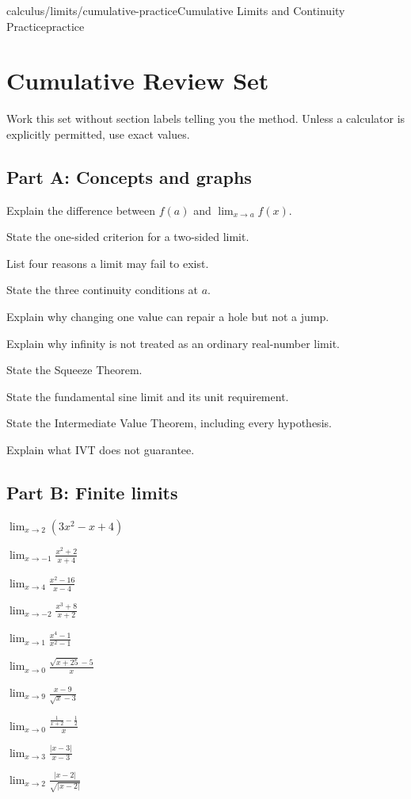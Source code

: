 \begin{webpage}{calculus/limits/cumulative-practice}{Cumulative Limits and Continuity Practice}{practice}
\section{Cumulative Review Set}

Work this set without section labels telling you the method. Unless a calculator is explicitly permitted, use exact values.

\subsection*{Part A: Concepts and graphs}
\begin{bgexercises}[label=\textbf{R\arabic*.}]
  \item Explain the difference between \(f(a)\) and \(\lim_{x\to a}f(x)\).
  \item State the one-sided criterion for a two-sided limit.
  \item List four reasons a limit may fail to exist.
  \item State the three continuity conditions at \(a\).
  \item Explain why changing one value can repair a hole but not a jump.
  \item Explain why infinity is not treated as an ordinary real-number limit.
  \item State the Squeeze Theorem.
  \item State the fundamental sine limit and its unit requirement.
  \item State the Intermediate Value Theorem, including every hypothesis.
  \item Explain what IVT does not guarantee.
\end{bgexercises}

\subsection*{Part B: Finite limits}
\begin{bgexercises}[label=\textbf{R\arabic*.},resume]
  \item \(\displaystyle\lim_{x\to2}(3x^2-x+4)\)
  \item \(\displaystyle\lim_{x\to-1}\frac{x^2+2}{x+4}\)
  \item \(\displaystyle\lim_{x\to4}\frac{x^2-16}{x-4}\)
  \item \(\displaystyle\lim_{x\to-2}\frac{x^3+8}{x+2}\)
  \item \(\displaystyle\lim_{x\to1}\frac{x^4-1}{x^2-1}\)
  \item \(\displaystyle\lim_{x\to0}\frac{\sqrt{x+25}-5}{x}\)
  \item \(\displaystyle\lim_{x\to9}\frac{x-9}{\sqrt{x}-3}\)
  \item \(\displaystyle\lim_{x\to0}\frac{\frac1{x+2}-\frac12}{x}\)
  \item \(\displaystyle\lim_{x\to3}\frac{|x-3|}{x-3}\)
  \item \(\displaystyle\lim_{x\to2}\frac{|x-2|}{\sqrt{|x-2|}}\)
\end{bgexercises}


\end{webpage}
